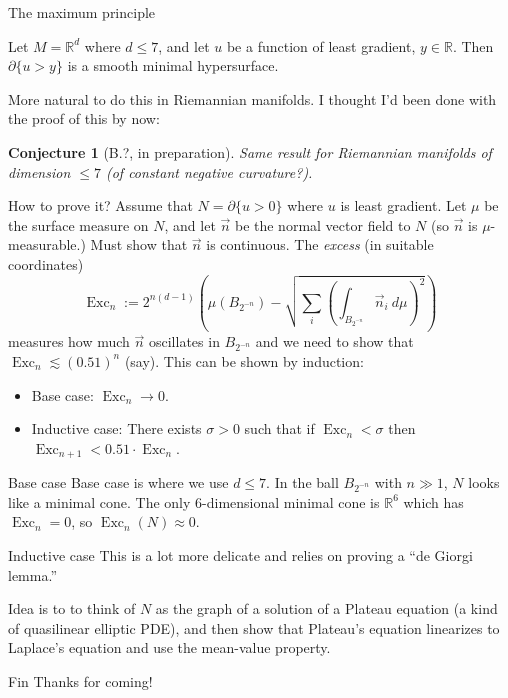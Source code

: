\documentclass[10pt]{beamer}
\newcommand{\RR}{\mathbb{R}}
\DeclareMathOperator{\Exc}{Exc}
\newcommand{\normal}{\vec n}
\newtheorem{conjecture}{Conjecture}
\begin{document}
\begin{frame}{The maximum principle}
\begin{theorem}
Let $M = \RR^d$ where $d \leq 7$, and let $u$ be a function of least gradient, $y \in \RR$. Then $\partial \{u > y\}$ is a smooth minimal hypersurface.
\end{theorem}
\pause
More natural to do this in Riemannian manifolds. I thought I'd been done with the proof of this by now:
\begin{conjecture}[B.?, in preparation]
Same result for Riemannian manifolds of dimension $\leq 7$ (of constant negative curvature?).
\end{conjecture}
\end{frame}

\begin{frame}{How to prove it?}
Assume that $N = \partial \{u > 0\}$ where $u$ is least gradient.
Let $\mu$ be the surface measure on $N$, and let $\normal$ be the normal vector field to $N$ (so $\normal$ is $\mu$-measurable.)
Must show that $\normal$ is continuous. \pause The \emph{excess} (in suitable coordinates)
$$\Exc_n := 2^{n(d - 1)} \left(\mu(B_{2^{-n}}) - \sqrt{\sum_i\left(\int_{B_{2^{-n}}} \normal_i ~d\mu\right)^2} \right)$$
measures how much $\normal$ oscillates in $B_{2^{-n}}$ and we need to show that $\Exc_n \lesssim (0.51)^n$ (say). This can be shown by induction:\pause
\begin{itemize}
\item Base case: $\Exc_n \to 0$. \pause
\item Inductive case: There exists $\sigma > 0$ such that if $\Exc_n < \sigma$ then $\Exc_{n + 1} < 0.51 \cdot \Exc_n$.\pause
\end{itemize}
\end{frame}

\begin{frame}{Base case}
Base case is where we use $d \leq 7$. In the ball $B_{2^{-n}}$ with $n \gg 1$, $N$ looks like a minimal cone. \pause
The only $6$-dimensional minimal cone is $\RR^6$ which has $\Exc_n = 0$, so $\Exc_n(N) \approx 0$.
\end{frame}

\begin{frame}{Inductive case}
    This is a lot more delicate and relies on proving a ``de Giorgi lemma.'' \pause 
    
    Idea is to to think of $N$ as the graph of a solution of a Plateau equation (a kind of quasilinear elliptic PDE), and then show that Plateau's equation linearizes to Laplace's equation and use the mean-value property.
\end{frame}

\begin{frame}{Fin}
    Thanks for coming!
\end{frame}
\end{document}
